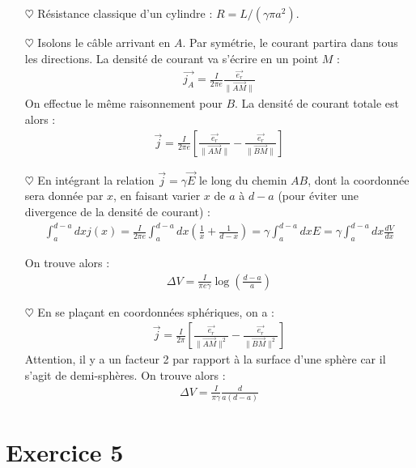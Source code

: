 \documentclass{report}
\begin{document}
\begin{itemize}

	\item[$\heartsuit$] Résistance classique d'un cylindre : $R=L/(\gamma\pi a^2)$.
	
	\item[$\heartsuit$] Isolons le câble arrivant en $A$. Par symétrie, le courant partira dans tous les directions. La densité de courant va s'écrire en un point $M$ :
	\begin{align*}
		\vec{j_A}=\frac{I}{2\pi e }\frac{\vec{e_r}}{\|\vec{AM} \|}
	\end{align*}
	On effectue le même raisonnement pour $B$. La densité de courant totale est alors :
	\begin{align*}
		\vec{j}=\frac{I}{2\pi e }\left[ \frac{\vec{e_r}}{\|\vec{AM} \|} - \frac{\vec{e_r}}{\|\vec{BM} \|}\right] 
	\end{align*}
	
	\item[$\heartsuit$] En intégrant la relation $\vec{j}=\gamma\vec{E}$ le long du chemin $AB$, dont la coordonnée sera donnée par $x$, en faisant varier $x$ de $a$ à $d-a$ (pour éviter une divergence de la densité de courant) :
	\begin{align*}
		\int_a^{d-a}dx j(x)=\frac{I}{2\pi e}\int_a^{d-a}dx\left(\frac{1}{x}+\frac{1}{d-x} \right) =\gamma\int_a^{d-a}dxE=\gamma\int_a^{d-a}dx\frac{dV}{dx}
	\end{align*}
	
	On trouve alors :
	\begin{align*}
		\Delta V = \frac{I}{\pi e\gamma}\log\left(\frac{d-a}{a} \right) 
	\end{align*}

	\item[$\heartsuit$] En se plaçant en coordonnées sphériques, on a :
	\begin{align*}
		\vec{j}=\frac{I}{2\pi}\left[ \frac{\vec{e_r}}{\|\vec{AM} \|^2} - \frac{\vec{e_r}}{\|\vec{BM} \|^2}\right] 
	\end{align*}
	Attention, il y a un facteur 2 par rapport à la surface d'une sphère car il s'agit de demi-sphères.
		On trouve alors :
	\begin{align*}
		\Delta V = \frac{I}{\pi \gamma}\frac{d}{a(d-a)}
	\end{align*}
	
\end{itemize}

\section*{Exercice 5}
\end{document}
